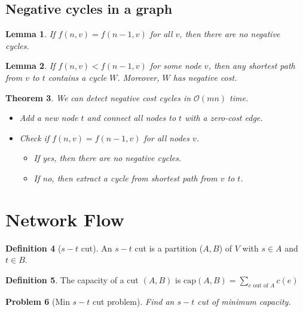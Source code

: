 \documentclass[10pt, oneside, reqno]{amsart}
\theoremstyle{plain}%
\newtheorem{thm}{Theorem}[section]
\newtheorem{prob}[thm]{Problem}
\newtheorem{lem}[thm]{Lemma}
\theoremstyle{definition}
\newtheorem{defn}[thm]{Definition}
\theoremstyle{remark}
\newcommand{\bigo}[1]{\mathcal{O}(#1)}
\begin{document}

\subsection{Negative cycles in a graph} %
\label{sub:negative_cycles_in_a_graph}

\begin{lem}
    If $f(n,v) = f(n-1,v)$ for all $v$, then there are no negative cycles.
\end{lem}

\begin{lem}
    If $f(n,v) < f(n-1,v)$ for some node $v$, then any shortest path from $v$ to $t$ contains a cycle $W$.  Moreover, $W$ has negative cost.
\end{lem}

\begin{thm}
    We can detect negative cost cycles in $\bigo{mn}$ time. 
    \begin{itemize}
        \item Add a new node $t$ and connect all nodes to $t$ with a zero-cost edge.
        \item Check if $f(n,v) = f(n-1,v)$ for all nodes $v$.
        \begin{itemize}
            \item If yes, then there are no negative cycles.
            \item If no, then extract a cycle from shortest path from $v$ to $t$.
        \end{itemize}
    \end{itemize}
\end{thm}



\section{Network Flow} %
\begin{defn}[$s-t$ cut]
    An $s-t$ cut is a partition ($A,B$) of $V$ with $s \in A$ and $t \in B$.
\end{defn}

\begin{defn}
The capacity of a cut $(A,B)$ is $\text{cap}(A,B) = \displaystyle\sum_{\text{$e$ out of $A$}}c(e)$
\end{defn}

\begin{prob}[Min $s-t$ cut problem]
Find an $s-t$ cut of minimum capacity.
\end{prob}
\end{document}
